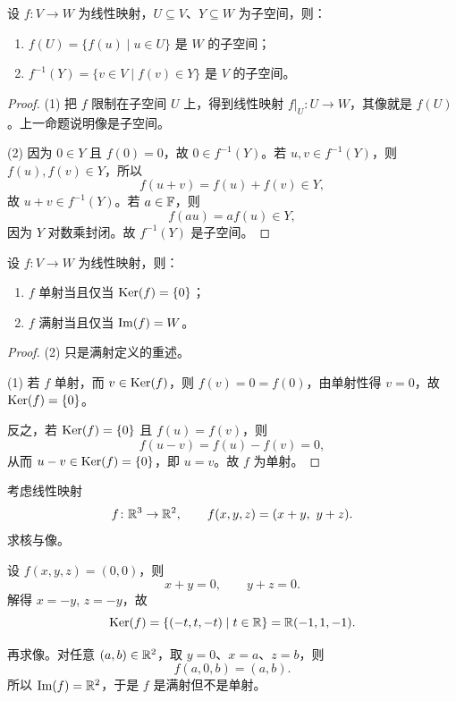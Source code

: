 \begin{proposition}
设 $f\colon V\to W$ 为线性映射，$U\subseteq V$、$Y\subseteq W$ 为子空间，则：
\begin{enumerate}[label=\textnormal{(\arabic*)}]
  \item $f(U)=\{f(u)\mid u\in U\}$ 是 $W$ 的子空间；
  \item $f^{-1}(Y)=\{v\in V\mid f(v)\in Y\}$ 是 $V$ 的子空间。
\end{enumerate}
\end{proposition}

\begin{proof}
(1) 把 $f$ 限制在子空间 $U$ 上，得到线性映射 $f|_U\colon U\to W$，其像就是 $f(U)$。上一命题说明像是子空间。

(2) 因为 $0\in Y$ 且 $f(0)=0$，故 $0\in f^{-1}(Y)$。若 $u,v\in f^{-1}(Y)$，则 $f(u),f(v)\in Y$，所以
\[
  f(u+v)=f(u)+f(v)\in Y,
\]
故 $u+v\in f^{-1}(Y)$。若 $a\in\mathbb{F}$，则
\[
  f(au)=af(u)\in Y,
\]
因为 $Y$ 对数乘封闭。故 $f^{-1}(Y)$ 是子空间。
\end{proof}

\begin{proposition}
设 $f\colon V\to W$ 为线性映射，则：
\begin{enumerate}[label=\textnormal{(\arabic*)}]
  \item $f$ 单射当且仅当 $\mathrm{Ker}(f)=\{0\}$；
  \item $f$ 满射当且仅当 $\mathrm{Im}(f)=W$。
\end{enumerate}
\end{proposition}

\begin{proof}
(2) 只是满射定义的重述。

(1) 若 $f$ 单射，而 $v\in\mathrm{Ker}(f)$，则 $f(v)=0=f(0)$，由单射性得 $v=0$，故 $\mathrm{Ker}(f)=\{0\}$。

反之，若 $\mathrm{Ker}(f)=\{0\}$ 且 $f(u)=f(v)$，则
\[
  f(u-v)=f(u)-f(v)=0,
\]
从而 $u-v\in\mathrm{Ker}(f)=\{0\}$，即 $u=v$。故 $f$ 为单射。
\end{proof}

\begin{example}
考虑线性映射
\[
  f\colon \mathbb{R}^3\to\mathbb{R}^2,
  \qquad
  f(x,y,z)=(x+y,\ y+z).
\]
求核与像。

设 $f(x,y,z)=(0,0)$，则
\[
  x+y=0,\qquad y+z=0.
\]
解得 $x=-y$, $z=-y$，故
\[
  \mathrm{Ker}(f)=\{(-t,t,-t)\mid t\in\mathbb{R}\}=\mathbb{R}(-1,1,-1).
\]

再求像。对任意 $(a,b)\in\mathbb{R}^2$，取 $y=0$、$x=a$、$z=b$，则
\[
  f(a,0,b)=(a,b).
\]
所以 $\mathrm{Im}(f)=\mathbb{R}^2$，于是 $f$ 是满射但不是单射。
\end{example}


